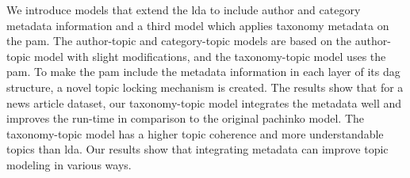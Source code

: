 We introduce models that extend the \gls{lda} to include author and category metadata information and a third model which applies taxonomy metadata on the \gls{pam}.
The author-topic and category-topic models are based on the author-topic model with slight modifications, and the taxonomy-topic model uses the \gls{pam}.
To make the \gls{pam} include the metadata information in each layer of its \gls{dag} structure, a novel topic locking mechanism is created.
The results show that for a news article dataset, our taxonomy-topic model integrates the metadata well and improves the run-time in comparison to the original pachinko model.
The taxonomy-topic model has a higher topic coherence and more understandable topics than \gls{lda}.
Our results show that integrating metadata can improve topic modeling in various ways.
